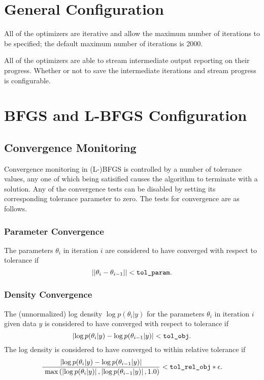\section{General Configuration}

All of the optimizers are iterative and allow the maximum number of
iterations to be specified;  the default maximum number of iterations
is 2000.  

All of the optimizers are able to stream intermediate output reporting
on their progress.  Whether or not to save the intermediate iterations
and stream progress is configurable.

\section{BFGS and L-BFGS Configuration}

\subsection{Convergence Monitoring}

Convergence monitoring in (L-)BFGS is controlled by a number of
tolerance values, any one of which being satisified causes the
algorithm to terminate with a solution. Any of the convergence tests
can be disabled by setting its corresponding tolerance parameter to
zero.  The tests for convergence are as follows.

\subsubsection{Parameter Convergence}

The parameters $\theta_i$ in iteration $i$ are considered to have
converged with respect to tolerance  if
%
\[
|| \theta_{i} - \theta_{i-1} || < \mbox{\code{tol\_param}}.
\]


\subsubsection{Density Convergence}
%
The (unnormalized) log density 
$\log p(\theta_{i}|y)$ for the parameters $\theta_i$ in iteration $i$
given data $y$ is considered to have converged with
respect to tolerance  if
%
\[
\left| \log p(\theta_{i}|y) - \log p(\theta_{i-1}|y) \right| <
\mbox{\code{tol\_obj}}.
\]
%
The log density is considered to have converged to within
relative tolerance  if
%
\[
\frac{\left| \log p(\theta_{i}|y) - \log p(\theta_{i-1}|y) \right|}{\
  \max\left(\left| \log p(\theta_{i}|y)\right|,\left| \log
      p(\theta_{i-1}|y)\right|,1.0\right)}
 < \mbox{\code{tol\_rel\_obj}} * \epsilon.
\]
%


